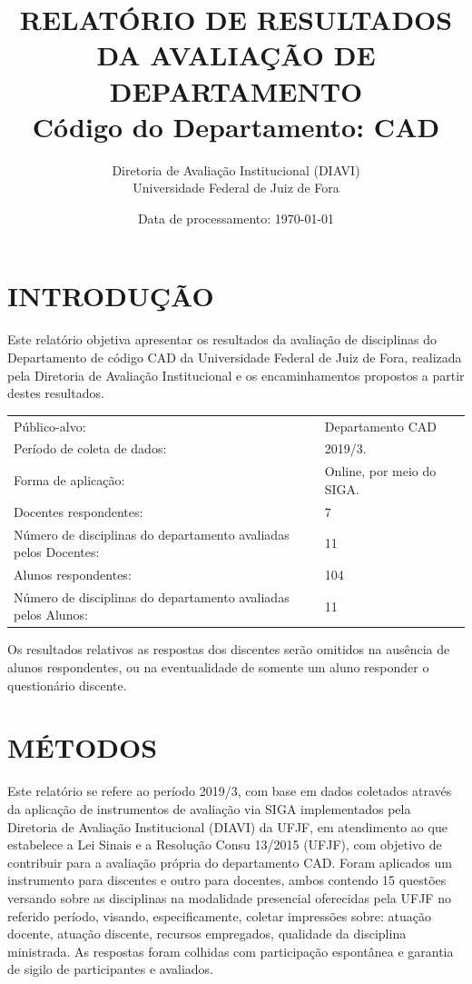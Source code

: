 \documentclass[a4paper,10pt]{article}
\date{Data de processamento: \today}
\begin{document}
\author{Diretoria de Avaliação Institucional (DIAVI) \\ Universidade Federal de Juiz de Fora}

\title{RELATÓRIO DE RESULTADOS DA AVALIAÇÃO DE DEPARTAMENTO\\ Código do Departamento: CAD}
\maketitle
\section{INTRODUÇÃO}
Este relatório objetiva apresentar os resultados da avaliação de disciplinas do Departamento     de código CAD da Universidade Federal de Juiz de Fora, realizada pela     Diretoria de Avaliação Institucional e os encaminhamentos propostos a     partir destes resultados.

\begin{center}
\begin{tabularx}{\linewidth}{X|l}

Público-alvo:& Departamento  CAD\\

Período de coleta de dados:& 2019/3.\\

Forma de aplicação:& Online, por meio do SIGA.\\

Docentes respondentes:& 7\\

Número de disciplinas do departamento avaliadas pelos Docentes:& 11\\

Alunos   respondentes:& 104\\

Número de disciplinas do departamento  avaliadas pelos   Alunos:& 11\\
\end{tabularx}
\end{center}

Os resultados relativos as respostas dos discentes serão omitidos na ausência de alunos respondentes, ou na eventualidade de somente um aluno responder o questionário discente.
\section{MÉTODOS}
Este relatório se refere ao período 2019/3, com base em dados     coletados através da aplicação de instrumentos de avaliação via SIGA     implementados pela Diretoria de Avaliação Institucional (DIAVI) da UFJF, em atendimento     ao que estabelece a Lei Sinais e a Resolução Consu 13/2015 (UFJF),     com objetivo de contribuir para a avaliação própria do departamento CAD.    Foram aplicados um instrumento para discentes e outro para docentes, ambos contendo     15 questões versando sobre as disciplinas na modalidade presencial oferecidas pela UFJF no     referido período, visando, especificamente, coletar impressões sobre: atuação docente, atuação discente,     recursos empregados, qualidade da disciplina ministrada.     As respostas foram colhidas      com participação espontânea e garantia de    sigilo de participantes e avaliados.
\end{document}
